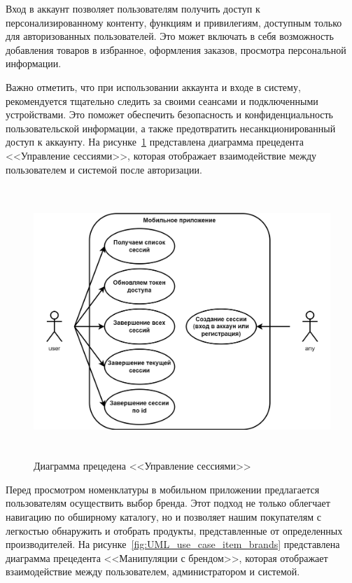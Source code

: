 Вход в аккаунт позволяет пользователям получить доступ к персонализированному контенту, функциям и привилегиям,
доступным только для авторизованных пользователей.
Это может включать в себя возможность добавления товаров в избранное, оформления заказов,
просмотра персональной информации.

Важно отметить, что при использовании аккаунта и входе в систему,
рекомендуется тщательно следить за своими сеансами и подключенными устройствами.
Это поможет обеспечить безопасность и конфиденциальность пользовательской информации,
а также предотвратить несанкционированный доступ к аккаунту.
На рисунке~\ref{fig:UML_precedent_sessions} представлена диаграмма прецедента <<Управление сессиями>>,
которая отображает взаимодействие между пользователем и системой после авторизации.

\begin{figure}[!htb]
    \centering

    \includegraphics[height=10.2cm]
    {images/UML/use_case/sessions/sessions.png}

    \caption{Диаграмма прецедена <<Управление сессиями>>}

    \label{fig:UML_precedent_sessions}
\end{figure}

Перед просмотром номенклатуры в мобильном приложении предлагается пользователям осуществить выбор бренда.
Этот подход не только облегчает навигацию по обширному каталогу,
но и позволяет нашим покупателям с легкостью обнаружить и отобрать продукты,
представленные от определенных производителей.
На рисунке~\ref{fig:UML_use_case_item_brands} представлена диаграмма прецедента <<Манипуляции с брендом>>,
которая отображает взаимодействие между пользователем, администратором и системой.


